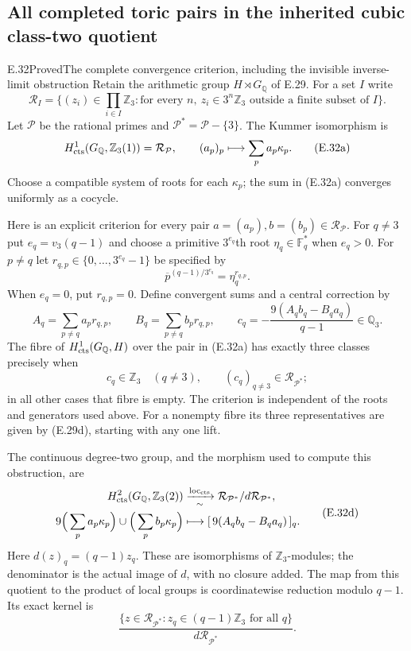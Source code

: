 \subsection{All completed toric pairs in the inherited cubic class-two quotient}

\begin{statement}{E.32}{Proved}{The complete convergence criterion, including the invisible inverse-limit obstruction}
Retain the arithmetic group $H\rtimes G_{\mathbb Q}$ of E.29.
For a set $I$ write
\[
 \mathcal R_I=\{(z_i)\in\textstyle\prod_{i\in I}\mathbb Z_3:
       \text{for every }n,\ z_i\in3^n\mathbb Z_3
       \text{ outside a finite subset of }I\}.
\]
Let $\mathcal P$ be the rational primes and
$\mathcal P^*=\mathcal P-\{3\}$. The Kummer isomorphism is
\[
 H^1_{\rm cts}(G_{\mathbb Q},\mathbb Z_3(1))
       =\mathcal R_{\mathcal P},\qquad
 (a_p)_p\longmapsto\sum_p a_p\kappa_p.                 \tag{E.32a}
\]
Choose a compatible system of roots for each $\kappa_p$;
the sum in (E.32a) converges uniformly as a cocycle.

Here is an explicit criterion for every pair
$a=(a_p),b=(b_p)\in\mathcal R_{\mathcal P}$.
For $q\ne3$ put $e_q=v_3(q-1)$ and choose a primitive
$3^{e_q}$th root $\eta_q\in\mathbb F_q^*$ when $e_q>0$.
For $p\ne q$ let $r_{q,p}\in\{0,\ldots,3^{e_q}-1\}$ be
specified by
\[
 \overline p^{(q-1)/3^{e_q}}=\eta_q^{r_{q,p}}.
\]
When $e_q=0$, put $r_{q,p}=0$. Define convergent sums and a
central correction by
\[
 A_q=\sum_{p\ne q}a_p r_{q,p},\qquad
 B_q=\sum_{p\ne q}b_p r_{q,p},\qquad
 c_q=-\frac{9(A_qb_q-B_qa_q)}{q-1}\in\mathbb Q_3.
                                                               \tag{E.32b}
\]
The fibre of $H^1_{\rm cts}(G_{\mathbb Q},H)$ over the pair
in (E.32a) has exactly three classes precisely when
\[
 c_q\in\mathbb Z_3\quad(q\ne3),\qquad
             (c_q)_{q\ne3}\in\mathcal R_{\mathcal P^*};       \tag{E.32c}
\]
in all other cases that fibre is empty. The criterion is
independent of the roots and generators used above.
For a nonempty fibre its three representatives are given by
(E.29d), starting with any one lift.

The continuous degree-two group, and the morphism used to
compute this obstruction, are
\[
 \begin{aligned}
 H^2_{\rm cts}(G_{\mathbb Q},\mathbb Z_3(2))
   &\xrightarrow[\sim]{\operatorname{loc}_{\rm cts}}
      \mathcal R_{\mathcal P^*}/d\mathcal R_{\mathcal P^*},\\
 9\Big(\sum_pa_p\kappa_p\Big)\cup
       \Big(\sum_pb_p\kappa_p\Big)
   &\longmapsto [\,9(A_qb_q-B_qa_q)\,]_q .
 \end{aligned}                                                 \tag{E.32d}
\]
Here $d(z)_q=(q-1)z_q$.
These are isomorphisms of $\mathbb Z_3$-modules; the denominator
is the actual image of $d$, with no closure added.
The map from this quotient to the product of local groups is
coordinatewise reduction modulo $q-1$. Its exact kernel is
\[
 \frac{\{z\in\mathcal R_{\mathcal P^*}:
                   z_q\in(q-1)\mathbb Z_3\text{ for all }q\}}
      {d\mathcal R_{\mathcal P^*}}.                            \tag{E.32e}
\]


\end{statement}
